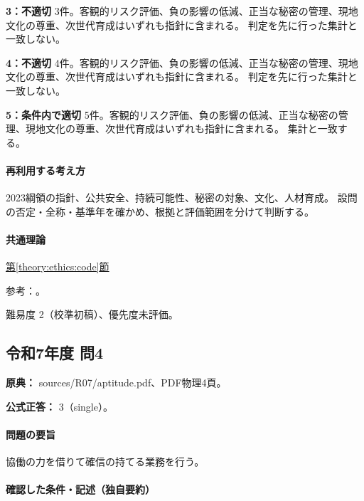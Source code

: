 \noindent\textbf{3：不適切} 3件。客観的リスク評価、負の影響の低減、正当な秘密の管理、現地文化の尊重、次世代育成はいずれも指針に含まれる。 判定を先に行った集計と一致しない。\par

\noindent\textbf{4：不適切} 4件。客観的リスク評価、負の影響の低減、正当な秘密の管理、現地文化の尊重、次世代育成はいずれも指針に含まれる。 判定を先に行った集計と一致しない。\par

\noindent\textbf{5：条件内で適切} 5件。客観的リスク評価、負の影響の低減、正当な秘密の管理、現地文化の尊重、次世代育成はいずれも指針に含まれる。 集計と一致する。\par

\paragraph{再利用する考え方} 2023綱領の指針、公共安全、持続可能性、秘密の対象、文化、人材育成。 設問の否定・全称・基準年を確かめ、根拠と評価範囲を分けて判断する。

\paragraph{共通理論} \hyperref[theory:ethics:code]{第\ref*{theory:ethics:code}節}

\par 参考：\cite{ipej_ethics2023}。

\par 難易度 2（校準初稿）、優先度未評価。

\subsection{令和7年度 問4}
\label{q:r07-reg-apt-04}

\noindent\textbf{原典：} sources/R07/aptitude.pdf、PDF物理4頁。

\textbf{公式正答：} 3（single）。

\paragraph{問題の要旨} 協働の力を借りて確信の持てる業務を行う。

\paragraph{確認した条件・記述（独自要約）}\mbox{}\par

